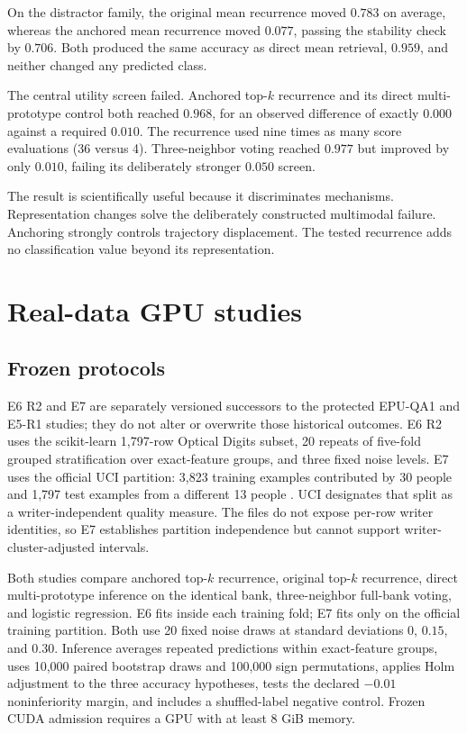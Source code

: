 \documentclass[11pt]{article}
\begin{document}
On the distractor family, the original mean recurrence moved $0.783$ on average, whereas the anchored mean recurrence moved $0.077$, passing the stability check by $0.706$. Both produced the same accuracy as direct mean retrieval, $0.959$, and neither changed any predicted class.

The central utility screen failed. Anchored top-$k$ recurrence and its direct multi-prototype control both reached $0.968$, for an observed difference of exactly $0.000$ against a required $0.010$. The recurrence used nine times as many score evaluations (36 versus 4). Three-neighbor voting reached $0.977$ but improved by only $0.010$, failing its deliberately stronger $0.050$ screen.

The result is scientifically useful because it discriminates mechanisms. Representation changes solve the deliberately constructed multimodal failure. Anchoring strongly controls trajectory displacement. The tested recurrence adds no classification value beyond its representation.

\section{Real-data GPU studies}
\subsection{Frozen protocols}
E6 R2 and E7 are separately versioned successors to the protected EPU-QA1 and E5-R1 studies; they do not alter or overwrite those historical outcomes. E6 R2 uses the scikit-learn 1,797-row Optical Digits subset, 20 repeats of five-fold grouped stratification over exact-feature groups, and three fixed noise levels. E7 uses the official UCI partition: 3,823 training examples contributed by 30 people and 1,797 test examples from a different 13 people \cite{uci1998}. UCI designates that split as a writer-independent quality measure. The files do not expose per-row writer identities, so E7 establishes partition independence but cannot support writer-cluster-adjusted intervals.

Both studies compare anchored top-$k$ recurrence, original top-$k$ recurrence, direct multi-prototype inference on the identical bank, three-neighbor full-bank voting, and logistic regression. E6 fits inside each training fold; E7 fits only on the official training partition. Both use 20 fixed noise draws at standard deviations $0$, $0.15$, and $0.30$. Inference averages repeated predictions within exact-feature groups, uses 10,000 paired bootstrap draws and 100,000 sign permutations, applies Holm adjustment to the three accuracy hypotheses, tests the declared $-0.01$ noninferiority margin, and includes a shuffled-label negative control. Frozen CUDA admission requires a GPU with at least 8 GiB memory.
\end{document}
